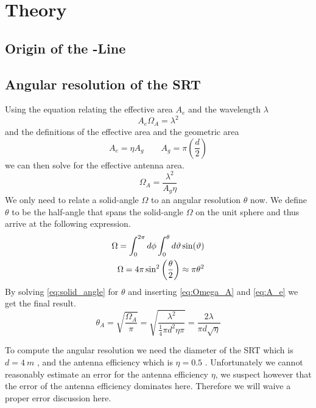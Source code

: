 \section{Theory}

\subsection[Origin of the HI-Line]{Origin of the -Line}

\subsection{Angular resolution of the SRT}\label{sec:ang_res}
Using the equation relating the effective area $A_e$ and the wavelength $\lambda$ \cite[p. 149]{wilson}
\begin{equation}
    A_e \Omega_A = \lambda^2
\end{equation}
and the definitions of the effective area and the geometric area \cite[p. 148]{wilson}
\begin{equation}
    A_e = \eta A_g \qquad A_g = \pi \left( \frac{d}{2} \right) \label{eq:A_e}
\end{equation}
we can then solve for the effective antenna area.
\begin{equation}
    \Omega_A = \frac{\lambda^2}{A_g \eta} \label{eq:Omega_A}
\end{equation}
We only need to relate a solid-angle $\Omega$ to an angular resolution $\theta$ now. We define $\theta$ to be the half-angle that spans the solid-angle $\Omega$ on the unit sphere and thus arrive at the following expression.
\begin{align}
    \Omega = \int_{0}^{2\pi} d\phi \int_{0}^{\theta} d\vartheta \sin(\vartheta) \notag \\
    \Omega = 4 \pi \sin^2 \left( \frac{\theta}{2} \right) \approx \pi \theta^2 \label{eq:solid_angle}
\end{align}
By solving \eqref{eq:solid_angle} for $\theta$ and inserting \eqref{eq:Omega_A} and \eqref{eq:A_e} we get the final result.
\begin{equation}
    \theta_A = \sqrt{\frac{\Omega_A}{\pi}} = \sqrt{\frac{\lambda^2}{\frac{1}{4} \pi d^2 \eta \pi}} = \frac{2\lambda}{\pi d \sqrt{\eta}} \label{eq:half_angle}
\end{equation}

To compute the angular resolution we need the diameter of the SRT which is $d = \SI{4}{m}$ \cite[p. 4]{srt}, and the antenna efficiency which is $\eta = 0.5$ \cite[p. 2]{srt}.
Unfortunately we cannot reasonably estimate an error for the antenna efficiency $\eta$, we suspect however that the error of the antenna efficiency dominates here.
Therefore we will waive a proper error discussion here.

